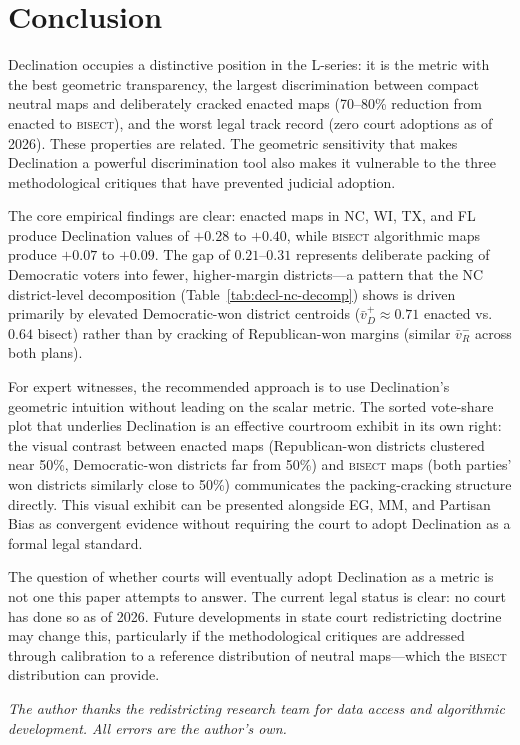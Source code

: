 \section{Conclusion}
\label{sec:conclusion}

Declination occupies a distinctive position in the L-series: it is the metric with
the best geometric transparency, the largest discrimination between compact neutral
maps and deliberately cracked enacted maps (70--80\% reduction from enacted to
\textsc{bisect}), and the worst legal track record (zero court adoptions as of 2026).
These properties are related. The geometric sensitivity that makes Declination a
powerful discrimination tool also makes it vulnerable to the three methodological
critiques that have prevented judicial adoption.

The core empirical findings are clear: enacted maps in NC, WI, TX, and FL produce
Declination values of $+0.28$ to $+0.40$, while \textsc{bisect} algorithmic maps
produce $+0.07$ to $+0.09$. The gap of $0.21$--$0.31$ represents deliberate
packing of Democratic voters into fewer, higher-margin districts---a pattern that
the NC district-level decomposition (Table~\ref{tab:decl-nc-decomp}) shows is
driven primarily by elevated Democratic-won district centroids ($\bar{v}_D^+ \approx
0.71$ enacted vs.\ $0.64$ bisect) rather than by cracking of Republican-won margins
(similar $\bar{v}_R^-$ across both plans).

For expert witnesses, the recommended approach is to use Declination's geometric
intuition without leading on the scalar metric. The sorted vote-share plot that
underlies Declination is an effective courtroom exhibit in its own right: the visual
contrast between enacted maps (Republican-won districts clustered near 50\%, Democratic-won
districts far from 50\%) and \textsc{bisect} maps (both parties' won districts similarly
close to 50\%) communicates the packing-cracking structure directly. This visual
exhibit can be presented alongside EG, MM, and Partisan Bias as convergent evidence
without requiring the court to adopt Declination as a formal legal standard.

The question of whether courts will eventually adopt Declination as a metric is not
one this paper attempts to answer. The current legal status is clear: no court has
done so as of 2026. Future developments in state court redistricting doctrine may
change this, particularly if the methodological critiques are addressed through
calibration to a reference distribution of neutral maps---which the \textsc{bisect}
distribution can provide.

\bigskip

\noindent\textit{The author thanks the redistricting research team for data
access and algorithmic development. All errors are the author's own.}
